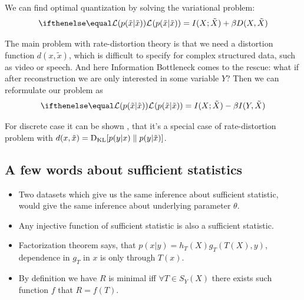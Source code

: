 \documentclass{article}
\begin{document}

%


We can find optimal quantization by solving the variational problem:
\[
\loss{p(\tilde{x} | \tilde{x})} = I(X; \tilde{X}) + \beta D(X, \tilde{X})
\]

The main problem with rate-distortion theory is that we need a distortion function $d(x, \tilde{x})$, which is difficult to specify for complex structured data, such as video or speech.
And here Information Bottleneck comes to the rescue: what if after reconstruction we are only interested in some variable $Y$?
Then we can reformulate our problem as
\[
\loss{p(\tilde{x} | \tilde{x})} = I(X; \tilde{X}) - \beta I(Y, \tilde{X})
\]

For discrete case it can be shown \cite{Information_Bottleneck}, that it's a special case of rate-distortion problem with $d(x, \tilde{x}) = \text{D}_\text{KL}[p(y|x) \parallel p(y|\tilde{x})]$.

\subsection{A few words about sufficient statistics}
\begin{itemize}
    \item Two datasets which give us the same inference about sufficient statistic, would give the same inference about underlying parameter $\theta$.
    \item Any injective function of sufficient statistic is also a sufficient statistic.
    \item Factorization theorem says, that $p(x|y) = h_T(X) g_T(T(X), y)$, dependence in $g_T$ in $x$ is only through $T(x)$.
    \item By definition we have $R$ is minimal iff $\forall T \in S_Y(X)$ there exists such function $f$ that $R = f(T)$.
\end{itemize}
\end{document}
